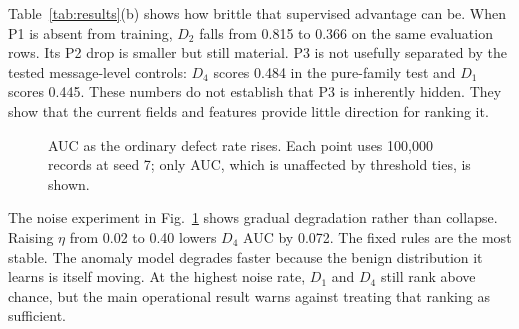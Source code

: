 \documentclass[conference]{IEEEtran}
\begin{document}
Table~\ref{tab:results}(b) shows how brittle that supervised advantage can be.
When P1 is absent from training, $D_2$ falls from 0.815 to 0.366 on the same
evaluation rows. Its P2 drop is smaller but still material. P3 is not usefully
separated by the tested message-level controls: $D_4$ scores 0.484 in the
pure-family test and $D_1$ scores 0.445. These numbers do not establish that P3
is inherently hidden. They show that the current fields and features provide
little direction for ranking it.

\begin{figure}[!t]
\centering
{}
\caption{AUC as the ordinary defect rate rises. Each point uses 100,000
records at seed 7; only AUC, which is unaffected by threshold ties, is shown.}
\label{fig:eta}
\end{figure}

The noise experiment in Fig.~\ref{fig:eta} shows gradual degradation rather
than collapse. Raising $\eta$ from 0.02 to 0.40 lowers $D_4$ AUC by 0.072. The
fixed rules are the most stable. The anomaly model degrades faster because the
benign distribution it learns is itself moving. At the highest noise rate,
$D_1$ and $D_4$ still rank above chance, but the main operational result warns
against treating that ranking as sufficient.
\end{document}
